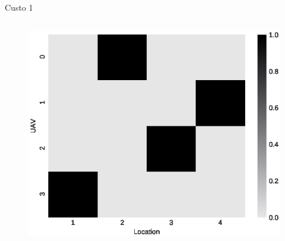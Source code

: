 \begin{frame}{Custo 1}
\begin{columns}
\begin{column}{0.45\textwidth}
\begin{figure}[!htb]
                \end{figure}
                \vspace{-0.5cm}
               \begin{figure}[!htb]
                    \includegraphics[width=\textwidth]{custo_1/0_f_mij_.eps}
                \end{figure}
            \end{column}
        \end{columns}
    \end{frame}